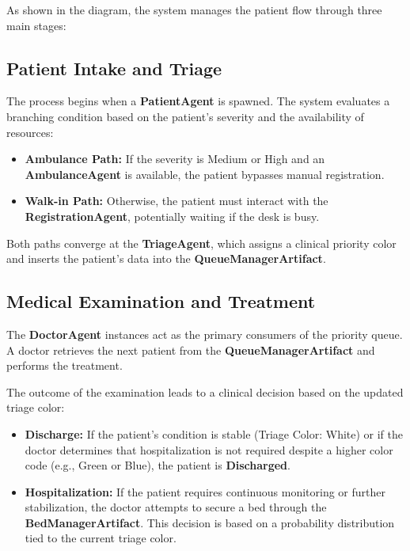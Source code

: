 \documentclass{article}[12pt]
\begin{document}
\noindent
As shown in the diagram, the system manages the patient flow through three main stages:

\subsection{Patient Intake and Triage}

\noindent
The process begins when a \textbf{PatientAgent} is spawned. The system evaluates a branching condition based on the patient's severity and the availability of resources:
\begin{itemize}
    \item \textbf{Ambulance Path:} If the severity is Medium or High and an \textbf{AmbulanceAgent} is available, the patient bypasses manual registration.
    \item \textbf{Walk-in Path:} Otherwise, the patient must interact with the \textbf{RegistrationAgent}, potentially waiting if the desk is busy.
\end{itemize}

\noindent
Both paths converge at the \textbf{TriageAgent}, which assigns a clinical priority color and inserts the patient's data into the \textbf{QueueManagerArtifact}.

\subsection{Medical Examination and Treatment}

\noindent
The \textbf{DoctorAgent} instances act as the primary consumers of the priority queue. A doctor retrieves the next patient from the \textbf{QueueManagerArtifact} and performs the treatment. 

\noindent
The outcome of the examination leads to a clinical decision based on the updated triage color:
\begin{itemize}
    \item \textbf{Discharge:} If the patient's condition is stable (Triage Color: White) or if the doctor determines that hospitalization is not required despite a higher color code (e.g., Green or Blue), the patient is \textbf{Discharged}.
    \item \textbf{Hospitalization:} If the patient requires continuous monitoring or further stabilization, the doctor attempts to secure a bed through the \textbf{BedManagerArtifact}. This decision is based on a probability distribution tied to the current triage color.
\end{itemize}
\end{document}
